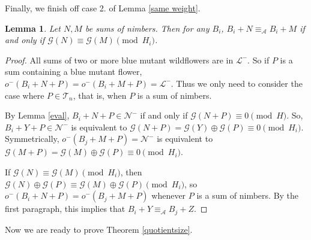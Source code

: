\documentclass{amsart}
\theoremstyle{plain}
\newtheorem{lemma}[thm]{Lemma}
\theoremstyle{definition}
\theoremstyle{remark}
\numberwithin{equation}{section}
\numberwithin{thm}{section}
\begin{document}
Finally, we finish off case 2. of Lemma \ref{same weight}.

\begin{lemma}
   \label{2}
  Let $N,M$ be sums of nimbers. Then
  for any $B_i$, $B_i + N \equiv_{\mathscr{A}} B_i+M$ if and only if  $\mathcal{G}(N) \equiv \mathcal{G}(M) \pmod {H_i}$.
\end{lemma}
\begin{proof}
   All sums of two or more blue mutant wildflowers are in $\mathcal{L}^-$. So if $P$ is a sum containing a blue mutant flower, $o^-(B_i+N +P)= o^-(B_i+M+P) = \mathcal{L}^-$. Thus we only need to consider the case where $P \in \mathscr{T}_n$, that is, when $P$ is a sum of nimbers. 
    
    By Lemma \ref{eval}, $B_i +  N+P \in\mathcal{N}^-$ if and only if $\mathcal{G}(N+P) \equiv 0 \pmod H$. So, $B_i + Y+P \in \mathcal{N}^-$ is equivalent to $\mathcal{G}(N+P) =\mathcal{G}(Y) \oplus \mathcal{G}(P) \equiv 0 \pmod {H_i}$. Symmetrically,  $o^-(B_j + M+P) = \mathcal{N}^-$ is equivalent to $\mathcal{G}(M+P) = \mathcal{G}(M) \oplus \mathcal{G}(P) \equiv 0 \pmod {H_i}$.
    
    If $\mathcal{G}(N) \equiv \mathcal{G}(M) \pmod {H_i}$, then $\mathcal{G}(N) \oplus \mathcal{G}(P) \equiv \mathcal{G}(M) \oplus \mathcal{G}(P)  \pmod {H_i}$, so $o^-(B_i + N+P) = o^-(B_j + M+P)$ whenever $P$ is a sum of nimbers. By the first paragraph, this implies that $B_i + Y \equiv_{\mathscr{A}} B_j +Z$.
\end{proof}
Now we are ready to prove Theorem \ref{quotientsize}.
\end{document}
